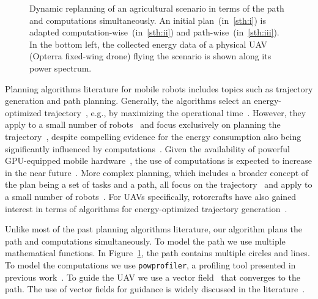 \documentclass[letterpaper,10pt,conference]{ieeeconf}
\newcommand{\stt}[1]{{\small\tt #1}} %
\newcommand{\powprof}{\stt{powprofiler}}
\newcommand{\figpath}{./figures}
\theoremstyle{definition}
\begin{document}
\begin{figure}[t]
  \centering
  \caption{Dynamic replanning of an agricultural scenario in terms of the path and computations simultaneously. An initial plan~(in~\ref{sth:i}) is adapted computation-wise~(in~\ref{sth:ii}) and path-wise~(in~\ref{sth:iii}). In the bottom left, the collected energy data of a physical UAV (Opterra fixed-wing drone) flying the scenario is shown along its power spectrum.}
  \label{fig:il-abs}
\end{figure}

Planning algorithms literature for mobile robots includes topics such as trajectory generation and path planning. Generally, the algorithms select an energy-optimized trajectory~\cite{mei2004energy}, e.g., by maximizing the operational time~\cite{wahab2015energy}. However, they apply to a small number of robots~\cite{kim2005energy} and focus exclusively on planning the trajectory~\cite{kim2008minimum}, despite compelling evidence for the energy consumption also being significantly influenced by computations~\cite{mei2005case}. Given the availability of powerful GPU-equipped mobile hardware~\cite{rizvi2017general}, the use of computations is expected to increase in the near future~\cite{abramov2012real,satria2016real,jaramillo2019visual}. More complex planning, which includes a broader concept of the plan being a set of tasks and a path, all focus on the trajectory~\cite{mei2005case,mei2006deployment} and apply to a small number of robots~\cite{sadrpour2013mission,sadrpour2013experimental}. For UAVs specifically, rotorcrafts have also gained interest in terms of algorithms for energy-optimized trajectory generation~\cite{morbidi2016minimum,kreciglowa2017energy}. 

Unlike most of the past planning algorithms literature, our algorithm plans the path and computations simultaneously. To model the path we use multiple mathematical functions. In Figure~\ref{fig:il-abs}, the path contains multiple circles and lines. To model the computations we use \powprof{}, a profiling tool presented in previous work~\cite{seewald2019coarse}. To guide the UAV we use a vector field~\cite{de2017guidance} that converges to the path. The use of vector fields for guidance is widely discussed in the literature~\cite{lindemann2005smoothly,gonccalves2010vector,panagou2014motion,zhou2014vector,kapitanyuk2017guiding,de2017guidance}. 
\end{document}
